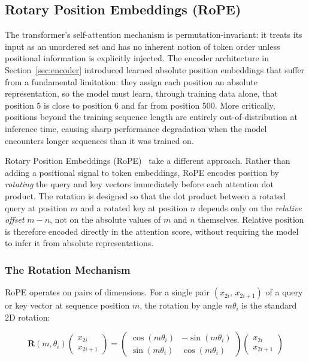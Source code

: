 \documentclass{book}
\begin{document}
\subsection{Rotary Position Embeddings (RoPE)}
 
The transformer's self-attention mechanism is permutation-invariant: it treats
its input as an unordered set and has no inherent notion of token order unless
positional information is explicitly injected. The encoder architecture in
Section~\ref{sec:encoder} introduced learned absolute position embeddings that suffer from a fundamental limitation: they assign each position an
absolute representation, so the model must learn, through training data alone,
that position 5 is close to position 6 and far from position 500. More
critically, positions beyond the training sequence length are entirely
out-of-distribution at inference time, causing sharp performance degradation
when the model encounters longer sequences than it was trained on.
 
Rotary Position Embeddings (RoPE)~\cite{su2024roformer} take a different
approach. Rather than adding a positional signal to token embeddings, RoPE
encodes position by \emph{rotating} the query and key vectors immediately
before each attention dot product. The rotation is designed so that the dot
product between a rotated query at position $m$ and a rotated key at position
$n$ depends only on the \emph{relative offset} $m - n$, not on the absolute
values of $m$ and $n$ themselves. Relative position is therefore encoded
directly in the attention score, without requiring the model to infer it from
absolute representations.
 
\subsubsection*{The Rotation Mechanism}
 
RoPE operates on pairs of dimensions. For a single pair $(x_{2i},\, x_{2i+1})$
of a query or key vector at sequence position $m$, the rotation by angle
$m\theta_i$ is the standard 2D rotation:
 
\begin{equation}
\mathbf{R}(m, \theta_i)
\begin{pmatrix} x_{2i} \\ x_{2i+1} \end{pmatrix}
=
\begin{pmatrix}
\cos(m\theta_i) & -\sin(m\theta_i) \\
\sin(m\theta_i) &  \cos(m\theta_i)
\end{pmatrix}
\begin{pmatrix} x_{2i} \\ x_{2i+1} \end{pmatrix}
\end{equation}
 
\end{document}
